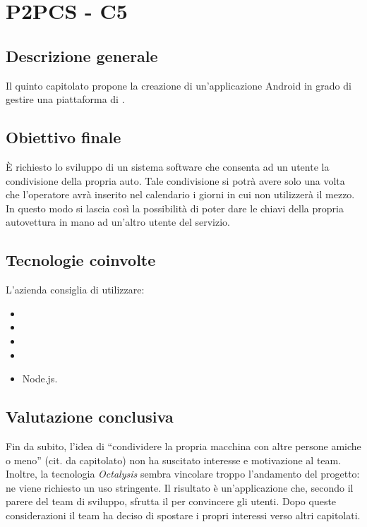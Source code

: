 \section{P2PCS - C5} \label{c5}
    \subsection{Descrizione generale}
    Il quinto capitolato propone la creazione di un'applicazione Android in grado di gestire una piattaforma di 
    .

    \subsection{Obiettivo finale}
    \`E richiesto lo sviluppo di un sistema software che consenta ad un utente la condivisione della propria auto. Tale condivisione si potrà
    avere solo una volta che l'operatore avrà inserito nel calendario i giorni in cui non utilizzerà il mezzo.
    In questo modo si lascia così la possibilità di poter dare le chiavi della propria autovettura in mano ad un'altro utente del servizio.

    \subsection{Tecnologie coinvolte}
    L'azienda consiglia di utilizzare:
        \begin{itemize}
        \item {}
        \item {}
        \item {}
        \item {}
        \item Node.js.
    \end{itemize}

    \subsection{Valutazione conclusiva}
    Fin da subito, l'idea di ``condividere la propria macchina con altre persone amiche o meno'' (cit. da capitolato) non ha suscitato interesse
    e motivazione al team. Inoltre, la tecnologia \textit{Octalysis} sembra vincolare troppo l'andamento del progetto: ne viene richiesto un
    uso stringente. Il risultato è un'applicazione che, secondo il parere del team di sviluppo, sfrutta il  per convincere gli utenti.
    Dopo queste considerazioni il team ha deciso di spostare i propri interessi verso altri capitolati.
